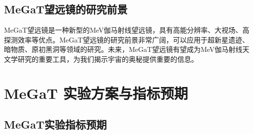 \subsection{MeGaT望远镜的研究前景}
MeGaT望远镜是一种新型的MeV伽马射线望远镜，具有高能分辨率、大视场、高探测效率等优点。MeGaT望远镜的研究前景非常广阔，可以应用于超新星遗迹、暗物质、原初黑洞等领域的研究。未来，MeGaT望远镜有望成为MeV伽马射线天文学研究的重要工具，为我们揭示宇宙的奥秘提供重要的信息。\par


\section{MeGaT 实验方案与指标预期}
\label{sec:explanation}

\subsection{MeGaT实验指标预期}








